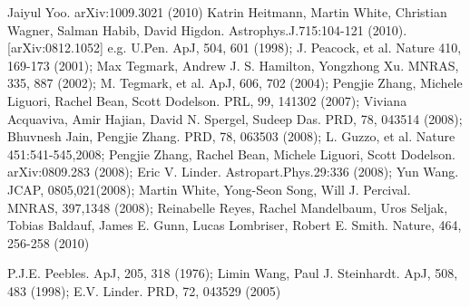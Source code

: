 \documentclass[aps,prl,showpacs,nobibnotes,twocolumn,
nobalancelastpage,superscriptaddress]{revtex4}
\begin{document}
\begin{thebibliography}{}
 Jaiyul Yoo. arXiv:1009.3021 (2010)
 Katrin Heitmann, Martin White, Christian Wagner, Salman
  Habib, David Higdon. Astrophys.J.715:104-121 (2010). [arXiv:0812.1052]
  e.g. U.Pen. ApJ, 504, 601 (1998); J. Peacock, et al. Nature 410, 169-173 (2001); Max Tegmark,
  Andrew J. S. Hamilton, Yongzhong
  Xu. MNRAS, 335, 887 (2002); M. Tegmark, et al. ApJ, 606, 702 (2004); Pengjie Zhang, Michele Liguori, Rachel Bean, Scott
  Dodelson. PRL, 99, 141302 (2007);  Viviana Acquaviva, Amir Hajian, David
  N. Spergel, Sudeep Das. PRD, 78, 043514 (2008); Bhuvnesh Jain, Pengjie
  Zhang. PRD, 78, 063503 (2008);   L. Guzzo, et al. Nature 451:541-545,2008; Pengjie Zhang, Rachel Bean, Michele
  Liguori, Scott Dodelson. arXiv:0809.283 (2008); Eric
  V. Linder. Astropart.Phys.29:336 (2008);  Yun Wang. JCAP, 0805,021(2008);
  Martin White, Yong-Seon Song, Will 
  J. Percival. MNRAS, 397,1348 (2008); Reinabelle Reyes, Rachel
  Mandelbaum, Uros Seljak, Tobias Baldauf, James E. Gunn, Lucas Lombriser,
  Robert E. Smith. Nature, 464, 256-258 (2010)

 P.J.E. Peebles. ApJ, 205, 318 (1976); Limin Wang, Paul
  J. Steinhardt. ApJ, 508, 483 (1998); E.V. Linder. PRD, 72, 043529 (2005)
\end{thebibliography} 
\end{document}
